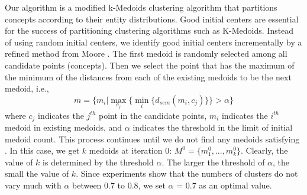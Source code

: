 Our algorithm is a modified k-Medoids clustering algorithm that partitions concepts according to their entity distributions. Good initial
centers are essential for the success of partitioning clustering algorithms such as K-Medoids. Instead of using random initial centers, we
identify good initial centers incrementally by a refined method from
Moore \cite{Moore:1991}. %
The first medoid is randomly selected among all candidate points
(concepts). Then we select the point that has the maximum of the
minimum of the distances from each of the existing medoids to be the
next medoid, i.e.,
\begin{equation}
m = \{m_i|\max_{c_j}\{\min_{i}\{d_{sem}(m_i,c_j)\} \} > \alpha\}\label{eq:initMedoid}
\end{equation}
where $c_j$ indicates the $j^{th}$ point in the candidate points,
$m_i$ indicates the $i^{th}$ medoid in existing medoids, and $\alpha$ indicates the threshold in the limit of initial medoid count.
This process continues until we do not find any medoids satisfying .
In this case, we get $k$ medoids at iteration 0: $M^{0} = \{m_{1}^{0}, ..., m_{k}^{0}\}$. Clearly, the value of $k$ is determined by the
threshold $\alpha$. The larger the threshold of $\alpha$, the small the value of $k$. Since experiments show that the numbers of clusters do not
vary much with $\alpha$ between 0.7 to 0.8, we set $\alpha$ = 0.7 as an optimal value.

